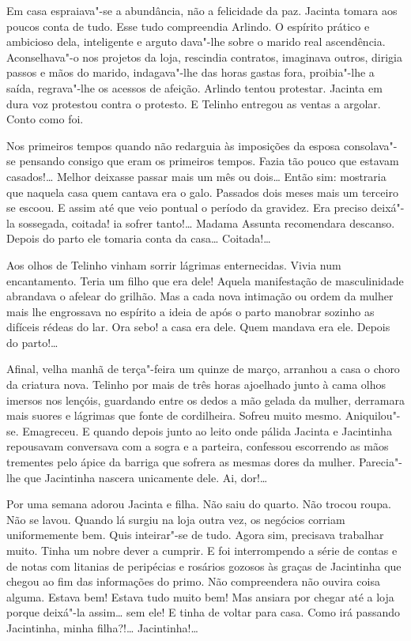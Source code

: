 \begin{linenumbers}
Em casa espraiava"-se a abundância, não a felicidade da paz. Jacinta
tomara aos poucos conta de tudo. Esse tudo compreendia Arlindo. O
espírito prático e ambicioso dela, inteligente e arguto dava"-lhe sobre o
marido real ascendência. Aconselhava"-o nos projetos da loja, rescindia
contratos, imaginava outros, dirigia passos e mãos do marido,
indagava"-lhe das horas gastas fora, proibia"-lhe a saída, regrava"-lhe os
acessos de afeição. Arlindo tentou protestar. Jacinta em dura voz
protestou contra o protesto. E Telinho entregou as ventas a argolar.
Conto como foi.

Nos primeiros tempos quando não redarguia às imposições da esposa
consolava"-se pensando consigo que eram os primeiros tempos. Fazia tão
pouco que estavam casados!\ldots{} Melhor deixasse passar mais um mês ou
dois\ldots{} Então sim: mostraria que naquela casa quem cantava era o galo.
Passados dois meses mais um terceiro se escoou. E assim até que veio
pontual o período da gravidez. Era preciso deixá"-la sossegada, coitada!
ia sofrer tanto!\ldots{} Madama Assunta recomendara descanso. Depois do parto
ele tomaria conta da casa\ldots{} Coitada!\ldots{}

Aos olhos de Telinho vinham sorrir lágrimas enternecidas. Vivia num
encantamento. Teria um filho que era dele! Aquela manifestação de
masculinidade abrandava o afelear do grilhão. Mas a cada nova intimação
ou ordem da mulher mais lhe engrossava no espírito a ideia de após o
parto manobrar sozinho as difíceis rédeas do lar. Ora sebo! a casa era
dele. Quem mandava era ele. Depois do parto!\ldots{}

Afinal, velha manhã de terça"-feira um quinze de março, arranhou a casa o
choro da criatura nova. Telinho por mais de três horas ajoelhado junto à
cama olhos imersos nos lençóis, guardando entre os dedos a mão gelada da
mulher, derramara mais suores e lágrimas que fonte de cordilheira.
Sofreu muito mesmo. Aniquilou"-se. Emagreceu. E quando depois junto ao
leito onde pálida Jacinta e Jacintinha repousavam conversava com a sogra
e a parteira, confessou escorrendo as mãos trementes pelo ápice da
barriga que sofrera as mesmas dores da mulher. Parecia"-lhe que
Jacintinha nascera unicamente dele. Ai, dor!\ldots{}

Por uma semana adorou Jacinta e filha. Não saiu do quarto. Não trocou
roupa. Não se lavou. Quando lá surgiu na loja outra vez, os negócios
corriam uniformemente bem. Quis inteirar"-se de tudo. Agora sim,
precisava trabalhar muito. Tinha um nobre dever a cumprir. E foi
interrompendo a série de contas e de notas com litanias de peripécias e
rosários gozosos às graças de Jacintinha que chegou ao fim das
informações do primo. Não compreendera não ouvira coisa alguma. Estava
bem! Estava tudo muito bem! Mas ansiara por chegar até a loja porque
deixá"-la assim\ldots{} sem ele! E tinha de voltar para casa. Como irá
passando Jacintinha, minha filha?!\ldots{} Jacintinha!\ldots{}


\end{linenumbers}
